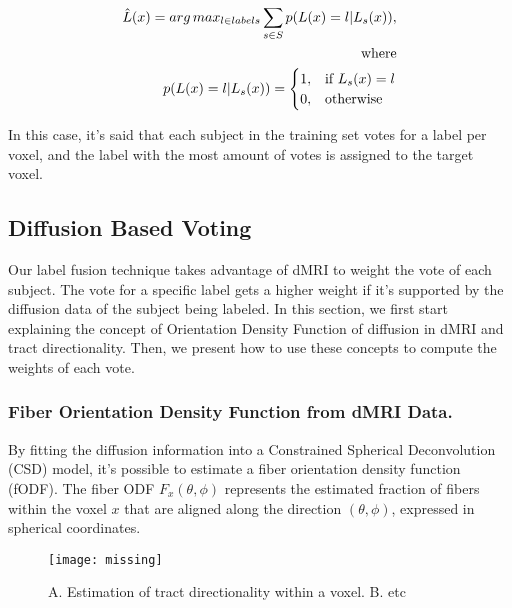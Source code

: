 \begin{equation}
\label{eq:mvoting}
\begin{aligned}
    \hat L(x) = arg\,max_{l \in labels} \sum_{s\in S} p(L(x) = l | L_s(x)),\\
    \text{where} \\
    p(L(x) = l | L_s(x)) =
    \begin{cases}
        1,& \text{if } L_s(x) = l \\
        0,& \text{otherwise}
    \end{cases}
\end{aligned}
\end{equation}

In this case, it's said that each subject in the training set votes for a label
per voxel, and the label with the most amount of votes is assigned to the target
voxel.

\subsection{Diffusion Based Voting}

Our label fusion technique takes advantage of dMRI to weight the vote of each
subject. The vote for a specific label gets a higher weight if it's supported
by the diffusion data of the subject being labeled. In this section, we first
start explaining the concept of Orientation Density Function of diffusion in
dMRI and tract directionality. Then, we present how to use these concepts to
compute the weights of each vote.

\subsubsection{Fiber Orientation Density Function from dMRI Data.}
By fitting the diffusion information into a Constrained Spherical Deconvolution (CSD)
model, it's possible to estimate a fiber orientation density function\cite{Tournier2004} (fODF). 
The fiber ODF $F_x(\theta, \phi)$ represents the estimated fraction of fibers
within the voxel $x$ that are aligned along the direction $(\theta, \phi)$,
expressed in spherical coordinates.

\begin{figure*}[t]
    \texttt{[image: missing]}
    \caption{A. Estimation of tract directionality within a voxel. B. etc}
    \label{fig:weighted_diffusion}
\end{figure*}


